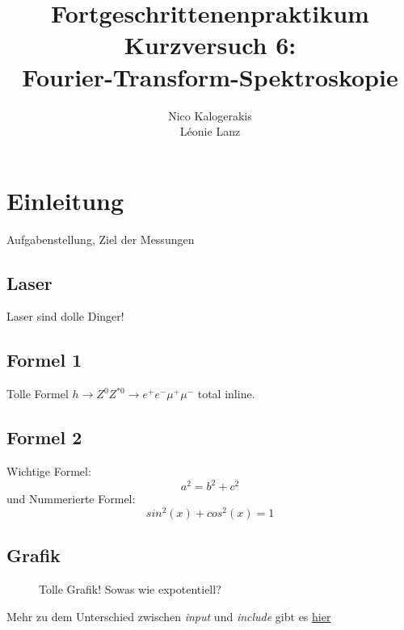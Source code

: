 \documentclass[10pt,a4paper]{article}
\begin{document}

\title{Fortgeschrittenenpraktikum\\ Kurzversuch 6:\\ Fourier-Transform-Spektroskopie }
\author{Nico Kalogerakis \\ Léonie Lanz}

\maketitle
\newpage

\tableofcontents
\vfill
\newpage


\section{Einleitung}

Aufgabenstellung, Ziel der Messungen

\subsection{Laser} Laser sind dolle Dinger!

\subsection{Formel 1} Tolle Formel $ h \rightarrow Z^0 Z^{*0} \rightarrow e^+ e^- \mu^+ \mu^- $ total inline.

\subsection{Formel 2} Wichtige Formel:
$$ a^2 = b^2 + c^2 $$
und Nummerierte Formel:
\begin{equation}
sin^2(x)+cos^2(x) = 1
\end{equation}


\subsection{Grafik}
\begin{figure}[h]
\centering


\caption[Parabel]{Tolle Grafik! Sowas wie expotentiell?}
\end{figure}
Mehr zu dem Unterschied zwischen \textit{input} und \textit{include} gibt es \href{http://de.wikibooks.org/wiki/LaTeX-W%C3%B6rterbuch:_include}{hier}
\end{document}
